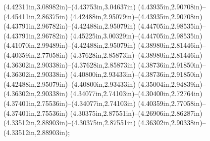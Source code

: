 (4.42311in,3.08982in)--(4.43753in,3.04637in) (4.43935in,2.90708in)--(4.45411in,2.86375in) (4.42488in,2.95079in)--(4.43935in,2.90708in) (4.43791in,2.96782in)--(4.42488in,2.95079in) (4.44705in,2.98535in)--(4.43791in,2.96782in) (4.45225in,3.00329in)--(4.44705in,2.98535in) (4.41070in,2.99489in)--(4.42488in,2.95079in) (4.38980in,2.81446in)--(4.40359in,2.77058in) (4.37628in,2.85873in)--(4.38980in,2.81446in) (4.36302in,2.90338in)--(4.37628in,2.85873in) (4.38736in,2.91850in)--(4.36302in,2.90338in) (4.40800in,2.93433in)--(4.38736in,2.91850in) (4.42488in,2.95079in)--(4.40800in,2.93433in) (4.35004in,2.94839in)--(4.36302in,2.90338in) (4.34077in,2.74103in)--(4.30400in,2.72764in) (4.37401in,2.75536in)--(4.34077in,2.74103in) (4.40359in,2.77058in)--(4.37401in,2.75536in) (4.30375in,2.87551in)--(4.26906in,2.86287in) (4.33512in,2.88903in)--(4.30375in,2.87551in) (4.36302in,2.90338in)--(4.33512in,2.88903in);
